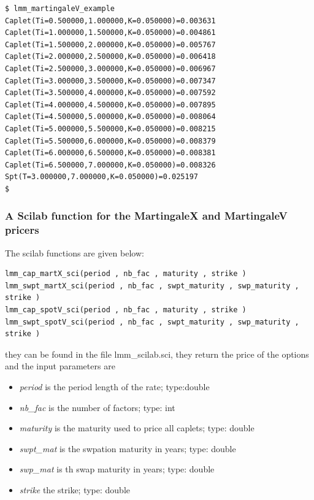 \small{

\begin{verbatim}
$ lmm_martingaleV_example 
Caplet(Ti=0.500000,1.000000,K=0.050000)=0.003631 
Caplet(Ti=1.000000,1.500000,K=0.050000)=0.004861 
Caplet(Ti=1.500000,2.000000,K=0.050000)=0.005767 
Caplet(Ti=2.000000,2.500000,K=0.050000)=0.006418 
Caplet(Ti=2.500000,3.000000,K=0.050000)=0.006967 
Caplet(Ti=3.000000,3.500000,K=0.050000)=0.007347 
Caplet(Ti=3.500000,4.000000,K=0.050000)=0.007592 
Caplet(Ti=4.000000,4.500000,K=0.050000)=0.007895 
Caplet(Ti=4.500000,5.000000,K=0.050000)=0.008064 
Caplet(Ti=5.000000,5.500000,K=0.050000)=0.008215 
Caplet(Ti=5.500000,6.000000,K=0.050000)=0.008379 
Caplet(Ti=6.000000,6.500000,K=0.050000)=0.008381 
Caplet(Ti=6.500000,7.000000,K=0.050000)=0.008326 
Spt(T=3.000000,7.000000,K=0.050000)=0.025197 
$ 
\end{verbatim}
}


\subsubsection{A Scilab function for the MartingaleX and MartingaleV pricers}

The scilab functions are given below:


\small{
\begin{verbatim}
lmm_cap_martX_sci(period , nb_fac , maturity , strike )
lmm_swpt_martX_sci(period , nb_fac , swpt_maturity , swp_maturity , strike )
lmm_cap_spotV_sci(period , nb_fac , maturity , strike )
lmm_swpt_spotV_sci(period , nb_fac , swpt_maturity , swp_maturity , strike )
\end{verbatim} 
}

they can be found in the file lmm\_scilab.sci,  they return the price of the options  and the input parameters are 

\begin{itemize}
\item {\it period} is the period length of the rate; type:double
\item {\it nb\_fac} is the number of factors; type: int
\item {\it maturity} is the maturity used to price all caplets; type: double
\item {\it swpt\_mat} is the swpation maturity in years; type: double
\item {\it swp\_mat} is th swap maturity in years; type: double
\item {\it strike} the strike; type: double
\end{itemize}


